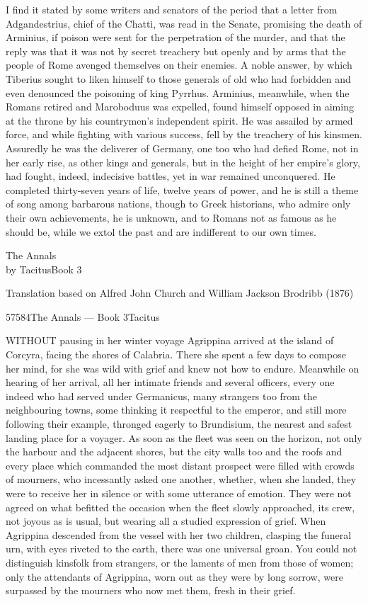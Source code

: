 
I find it stated by some writers and senators of the period that a letter from Adgandestrius, chief of the Chatti, was read in the Senate, promising the death of Arminius, if poison were sent for the perpetration of the murder, and that the reply was that it was not by secret treachery but openly and by arms that the people of Rome avenged themselves on their enemies. A noble answer, by which Tiberius sought to liken himself to those generals of old who had forbidden and even denounced the poisoning of king Pyrrhus. Arminius, meanwhile, when the Romans retired and Maroboduus was expelled, found himself opposed in aiming at the throne by his countrymen's independent spirit. He was assailed by armed force, and while fighting with various success, fell by the treachery of his kinsmen. Assuredly he was the deliverer of Germany, one too who had defied Rome, not in her early rise, as other kings and generals, but in the height of her empire's glory, had fought, indeed, indecisive battles, yet in war remained unconquered. He completed thirty-seven years of life, twelve years of power, and he is still a theme of song among barbarous nations, though to Greek historians, who admire only their own achievements, he is unknown, and to Romans not as famous as he should be, while we extol the past and are indifferent to our own times.


The Annals\\
by TacitusBook 3

Translation based on Alfred John Church and William Jackson Brodribb (1876)

57584The Annals — Book 3Tacitus


WITHOUT pausing in her winter voyage Agrippina arrived at the island of Corcyra, facing the shores of Calabria. There she spent a few days to compose her mind, for she was wild with grief and knew not how to endure. Meanwhile on hearing of her arrival, all her intimate friends and several officers, every one indeed who had served under Germanicus, many strangers too from the neighbouring towns, some thinking it respectful to the emperor, and still more following their example, thronged eagerly to Brundisium, the nearest and safest landing place for a voyager. As soon as the fleet was seen on the horizon, not only the harbour and the adjacent shores, but the city walls too and the roofs and every place which commanded the most distant prospect were filled with crowds of mourners, who incessantly asked one another, whether, when she landed, they were to receive her in silence or with some utterance of emotion. They were not agreed on what befitted the occasion when the fleet slowly approached, its crew, not joyous as is usual, but wearing all a studied expression of grief. When Agrippina descended from the vessel with her two children, clasping the funeral urn, with eyes riveted to the earth, there was one universal groan. You could not distinguish kinsfolk from strangers, or the laments of men from those of women; only the attendants of Agrippina, worn out as they were by long sorrow, were surpassed by the mourners who now met them, fresh in their grief.


